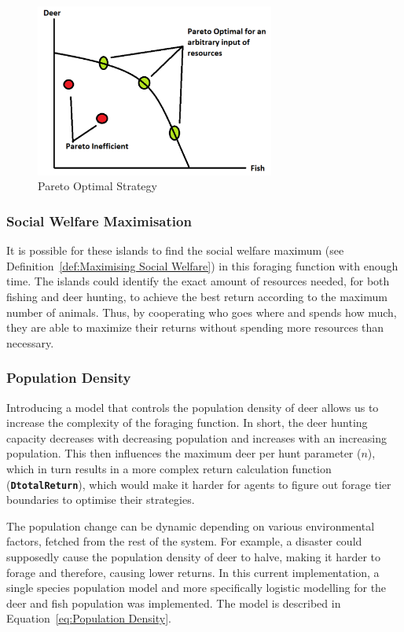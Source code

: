 \begin{figure}[!htb]
    \centering
    \includegraphics[width=0.7\textwidth]{04_environment/images/Pareto Optimal Strategy.PNG}
    \caption{Pareto Optimal Strategy}
    \label{fig:Pareto Optimal Strategy}
\end{figure}

\subsubsection{Social Welfare Maximisation}

It is possible for these islands to find the social welfare maximum (see Definition~\ref{def:Maximising Social Welfare}) in this foraging function with enough time. The islands could identify the exact amount of resources needed, for both fishing and deer hunting, to achieve the best return according to the maximum number of animals. Thus, by cooperating who goes where and spends how much, they are able to maximize their returns without spending more resources than necessary.

\subsubsection{Population Density}

Introducing a model that controls the population density of deer allows us to increase the complexity of the foraging function. In short, the deer hunting capacity decreases with decreasing population and increases with an increasing population. This then influences the maximum deer per hunt parameter ($n$), which in turn results in a more complex return calculation function (\texttt{\textbf{DtotalReturn}}), which would make it harder for agents to figure out forage tier boundaries to optimise their strategies.

The population change can be dynamic depending on various environmental factors, fetched from the rest of the system. For example, a disaster could supposedly cause the population density of deer to halve, making it harder to forage and therefore, causing lower returns. In this current implementation, a single species population model and more specifically logistic modelling for the deer and fish population was implemented. 
The model is described in Equation~\eqref{eq:Population Density}.

